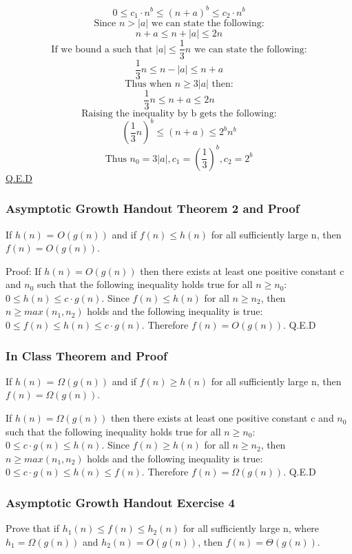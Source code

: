 \documentclass{article}
\begin{document}
$$0 \leq c_1 \cdot n^b \leq (n + a)^b \leq c_2 \cdot n^b$$
$$\text{Since } n > |a| \text{ we can state the following:}$$
$$n + a \leq n + |a| \leq 2n$$
$$\text{If we bound a such that } |a| \leq \frac{1}{3}n \text{ we can state the following:}$$
$$\frac{1}{3}n \leq n - |a| \leq n + a$$
$$\text{Thus when } n \geq 3|a| \text{ then:}$$
$$\frac{1}{3}n \leq n + a \leq 2n$$
$$\text{Raising the inequality by b gets the following:}$$
$$(\frac{1}{3}n)^b \leq (n + a) \leq 2^b n^b$$
$$\text{Thus } n_0 = 3|a|, c_1 = (\frac{1}{3})^b ,c_2 = 2^b$$
\href{http://hscc.cs.nthu.edu.tw/~sheujp/lecture_note/14algorithm/Chap\%203_HW.pdf}{Q.E.D}

\subsubsection{Asymptotic Growth Handout Theorem 2 and Proof}

If $h(n)$ = $O(g(n))$ and if $ f(n) \leq h(n) $ for all sufficiently large n, then $f(n) = O(g(n))$.

Proof:
If $h(n) = O(g(n))$ then there exists at least one positive constant c and $n_0$ such that the following inequality holds true for all $n \geq n_0$: $0 \leq h(n) \leq c \cdot g(n)$. Since $f(n) \leq h(n)$ for all $n \geq n_2$, then $n \geq max(n_1 , n_2)$ holds and the following inequality is true: $0 \leq f(n) \leq h(n) \leq c \cdot g(n)$. Therefore $f(n) = O(g(n))$. Q.E.D

\subsubsection{In Class Theorem and Proof}

If $h(n)$ = $\Omega(g(n))$ and if $ f(n) \geq h(n) $ for all sufficiently large n, then $f(n) = \Omega(g(n))$.

If $h(n) = \Omega(g(n))$ then there exists at least one positive constant c and $n_0$ such that the following inequality holds true for all $n \geq n_0$: $0 \leq c \cdot g(n) \leq h(n)$. Since $f(n) \geq h(n)$ for all $n \geq n_2$, then $n \geq max(n_1 , n_2)$ holds and the following inequality is true: $0 \leq c \cdot g(n) \leq h(n) \leq f(n) $. Therefore $f(n) = \Omega(g(n))$. Q.E.D

\subsubsection{Asymptotic Growth Handout Exercise 4}

Prove that if $h_1(n) \leq f(n) \leq h_2(n)$ for all sufficiently large n, where $h_1 = \Omega(g(n))$ and $h_2(n) = O(g(n))$, then $f(n) = \Theta(g(n))$.
\end{document}
